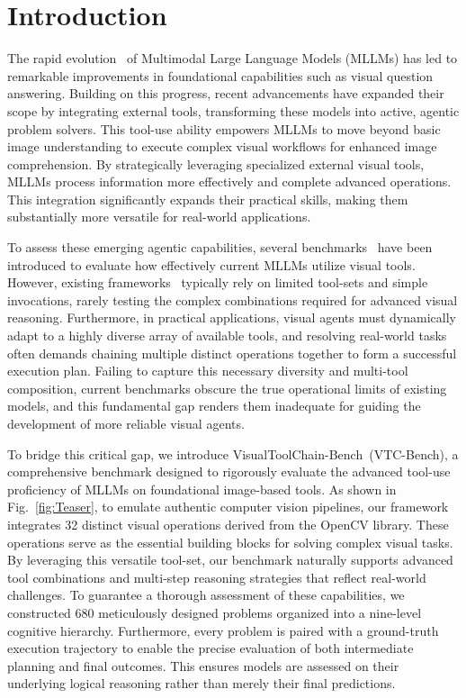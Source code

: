 \documentclass[runningheads]{llncs}
\newcommand{\benchname}{VTC-Bench\xspace}
\begin{document}
\section{Introduction}
The rapid evolution~\cite{gemini-2.5-pro,qwen3-vl,google2025gemini3flash,hurst2024gpt4o,openai2025gpt52,kimiteam2026kimik25visualagentic,glm5team2026glm5vibecodingagentic,zhang2025debiasingmultimodallargelanguage,bytedance2026seed2modelcard,google2026gemini,shi2025mavorsmultigranularityvideorepresentation} of Multimodal Large Language Models (MLLMs) has led to remarkable improvements in foundational capabilities such as visual question answering. Building on this progress, recent advancements have expanded their scope by integrating external tools, transforming these models into active, agentic problem solvers. This tool-use ability empowers MLLMs to move beyond basic image understanding to execute complex visual workflows for enhanced image comprehension. By strategically leveraging specialized external visual tools, MLLMs process information more effectively and complete advanced operations. This integration significantly expands their practical skills, making them substantially more versatile for real-world applications.

To assess these emerging agentic capabilities, several benchmarks~\cite{guo2025beyond, li2025tir, su2026agentvista} have been introduced to evaluate how effectively current MLLMs utilize visual tools. However, existing frameworks~\cite{su2026agentvista,guo2025beyond} typically rely on limited tool-sets and simple invocations, rarely testing the complex combinations required for advanced visual reasoning. Furthermore, in practical applications, visual agents must dynamically adapt to a highly diverse array of available tools, and resolving real-world tasks often demands chaining multiple distinct operations together to form a successful execution plan. Failing to capture this necessary diversity and multi-tool composition, current benchmarks obscure the true operational limits of existing models, and this fundamental gap renders them inadequate for guiding the development of more reliable visual agents.

To bridge this critical gap, we introduce VisualToolChain-Bench~(\benchname), a comprehensive benchmark designed to rigorously evaluate the advanced tool-use proficiency of MLLMs on foundational image-based tools. As shown in Fig.~\ref{fig:Teaser}, to emulate authentic computer vision pipelines, our framework integrates 32 distinct visual operations derived from the OpenCV library. These operations serve as the essential building blocks for solving complex visual tasks. By leveraging this versatile tool-set, our benchmark naturally supports advanced tool combinations and multi-step reasoning strategies that reflect real-world challenges. To guarantee a thorough assessment of these capabilities, we constructed 680 meticulously designed problems organized into a nine-level cognitive hierarchy. Furthermore, every problem is paired with a ground-truth execution trajectory to enable the precise evaluation of both intermediate planning and final outcomes. This ensures models are assessed on their underlying logical reasoning rather than merely their final predictions.
\end{document}
